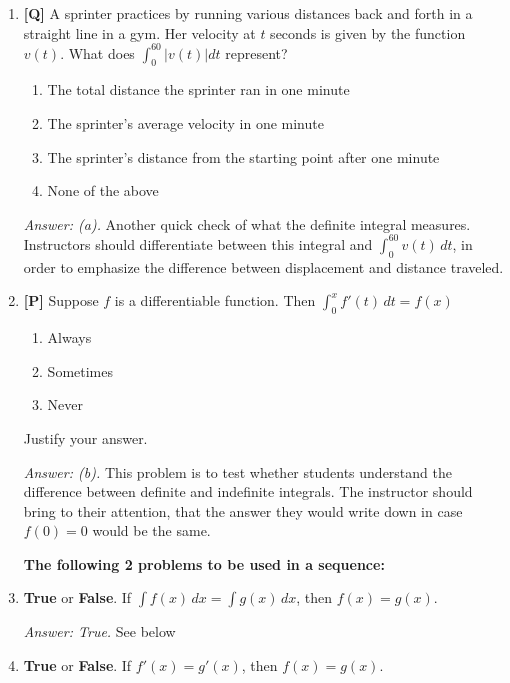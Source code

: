 \documentclass[12pt]{article}
\begin{document}
\begin{enumerate}

\item {\bf [Q]}
A sprinter practices by running various distances back and forth
in a straight line in a gym. Her velocity at $t$ seconds is given
by the function $v(t)$. What does $\int_0^{60} |v(t)|  dt$
represent?

\begin{enumerate}
\item The total distance the sprinter ran in one minute
\item The sprinter's average velocity in one minute
\item The sprinter's distance from the starting point after one minute
\item None of the above
\end{enumerate}

{\it Answer: (a).} Another quick check of what the definite
integral measures. Instructors should differentiate between this integral and
$\int_0^{60} v(t) \, dt$, in order to emphasize the difference between 
displacement and distance traveled. 

\bigskip

\item {\bf [P]} Suppose $f$ is a differentiable function. Then
$\displaystyle{\int_0^{x} f'(t) \, dt = f(x)}$

\begin{enumerate}
\item Always
\item Sometimes
\item Never
\end{enumerate}

Justify your answer.

{\it Answer: (b).} This problem is to test whether students
understand the difference between definite and indefinite
integrals. The instructor should bring to their attention, that
the answer they would write down in case $f(0)=0$ would be the
same. 

\bigskip

{\bf The following 2 problems to be used in a sequence:}

\item \textbf{True} or \textbf{False}. If $\int f(x) \, dx = \int g(x) \, dx$, then $f(x)=g(x).$

{\it Answer: True.} See below

\bigskip 

\item \textbf{True} or \textbf{False}. If $f'(x)=g'(x)$, then $f(x) = g(x)$.


\end{enumerate}
\end{document}
